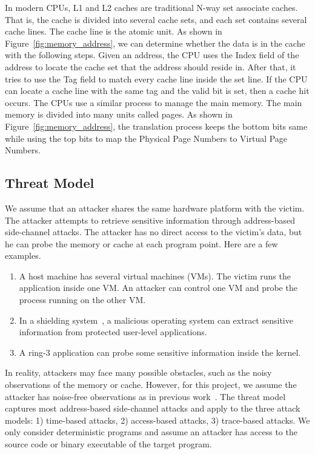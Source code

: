 In modern CPUs, L1 and L2 caches are traditional N-way set associate caches. That is, the cache is divided into several cache sets, and each set contains several cache lines. The cache line is the atomic unit. As shown in Figure~\ref{fig:memory_address}, we can determine whether the data is in the cache with the following steps.  Given an address, the CPU uses the \textsf{Index} field of the address to locate the cache set that the address should reside in. After that, it tries to use the \textsf{Tag} field to match every cache line inside the set line. If the CPU can locate a cache line with the same tag and the valid bit is set, then a cache hit occurs. The CPUs use a similar process to manage the main memory. The main memory is divided into many units called pages. As shown in Figure~\ref{fig:memory_address},
the translation process keeps the bottom bits same while using the top bits to map the Physical Page Numbers to Virtual Page Numbers. 

\subsection{Threat Model}
We assume that an attacker shares the same hardware platform with the victim.
The attacker attempts to retrieve sensitive information through address-based side-channel attacks. The attacker has no direct access to the victim's data, but he can probe the memory or cache at each program point. Here are a few examples.
\begin{enumerate}
  \item A host machine has several virtual machines (VMs). The victim runs the application inside one VM. An attacker can control one VM and probe the process running on the other VM.
  \item  In a shielding system~\cite{arnautov2016scone,schuster2015vc3}, a malicious operating system can extract sensitive information from protected user-level applications.
  \item A ring-3 application can probe some sensitive information inside the kernel.
\end{enumerate}

In reality, attackers may face many possible obstacles, such as the noisy observations of the memory or cache. However, for this project, we assume the attacker has noise-free observations as in previous work~\cite{203878,182946,Brotzman19Casym}. The threat model captures most address-based side-channel attacks and apply to the three attack models: 1) time-based attacks, 2) access-based attacks, 3) trace-based attacks. We only consider deterministic programs and assume an attacker has access to the source code or binary executable of the target program.

